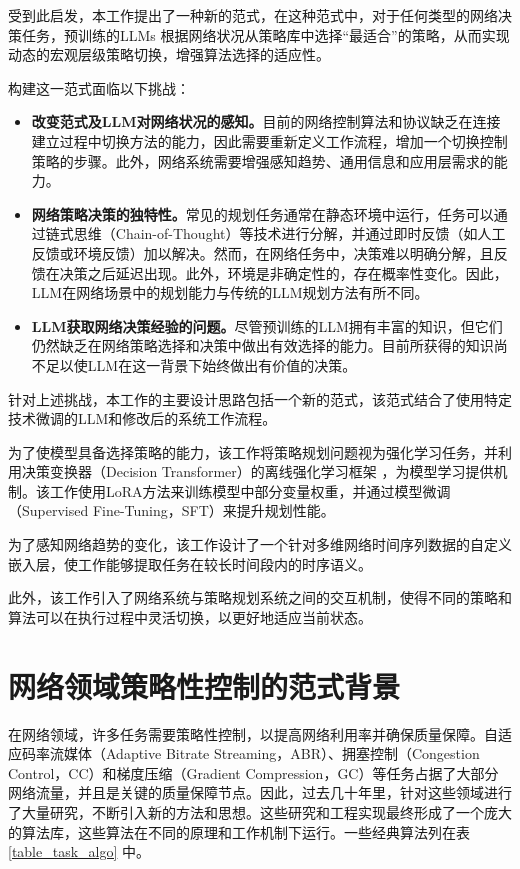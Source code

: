 受到此启发，本工作提出了一种新的范式，在这种范式中，对于任何类型的网络决策任务，预训练的LLMs 根据网络状况从策略库中选择“最适合”的策略，从而实现动态的宏观层级策略切换，增强算法选择的适应性。

构建这一范式面临以下挑战：

\begin{itemize} \item \textbf{改变范式及LLM对网络状况的感知。}目前的网络控制算法和协议缺乏在连接建立过程中切换方法的能力，因此需要重新定义工作流程，增加一个切换控制策略的步骤。此外，网络系统需要增强感知趋势、通用信息和应用层需求的能力。

\item \textbf{网络策略决策的独特性。}常见的规划任务通常在静态环境中运行，任务可以通过链式思维（Chain-of-Thought）等技术进行分解，并通过即时反馈（如人工反馈或环境反馈）加以解决。然而，在网络任务中，决策难以明确分解，且反馈在决策之后延迟出现。此外，环境是非确定性的，存在概率性变化。因此，LLM在网络场景中的规划能力与传统的LLM规划方法有所不同。

\item \textbf{LLM获取网络决策经验的问题。}尽管预训练的LLM拥有丰富的知识，但它们仍然缺乏在网络策略选择和决策中做出有效选择的能力。目前所获得的知识尚不足以使LLM在这一背景下始终做出有价值的决策。 
\end{itemize}

针对上述挑战，本工作的主要设计思路包括一个新的范式，该范式结合了使用特定技术微调的LLM和修改后的系统工作流程。

为了使模型具备选择策略的能力，该工作将策略规划问题视为强化学习任务，并利用决策变换器（Decision Transformer）的离线强化学习框架 \cite{chen2021decision}，为模型学习提供机制。该工作使用LoRA方法来训练模型中部分变量权重，并通过模型微调（Supervised Fine-Tuning，SFT）来提升规划性能。

为了感知网络趋势的变化，该工作设计了一个针对多维网络时间序列数据的自定义嵌入层，使工作能够提取任务在较长时间段内的时序语义。

此外，该工作引入了网络系统与策略规划系统之间的交互机制，使得不同的策略和算法可以在执行过程中灵活切换，以更好地适应当前状态。


\section{网络领域策略性控制的范式背景}
在网络领域，许多任务需要策略性控制，以提高网络利用率并确保质量保障。自适应码率流媒体（Adaptive Bitrate Streaming，ABR）、拥塞控制（Congestion Control，CC）和梯度压缩（Gradient Compression，GC）等任务占据了大部分网络流量，并且是关键的质量保障节点。因此，过去几十年里，针对这些领域进行了大量研究，不断引入新的方法和思想。这些研究和工程实现最终形成了一个庞大的算法库，这些算法在不同的原理和工作机制下运行。一些经典算法列在表\ref{table_task_algo} 中。

